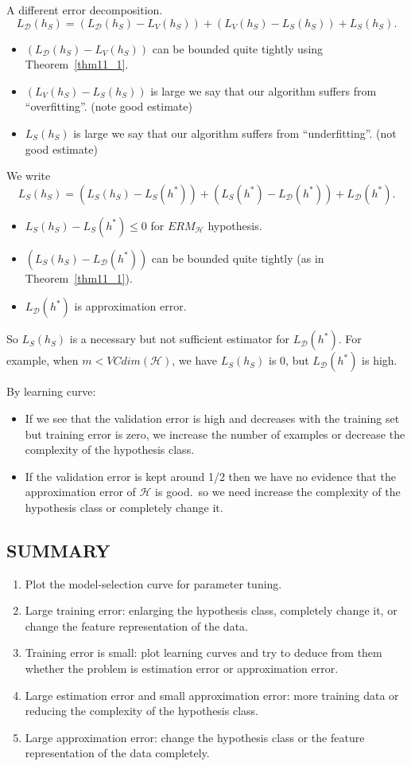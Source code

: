 A different error decomposition.
\[ L_\mathcal{D}(h_S) = (L_\mathcal{D}(h_S)-L_V(h_S)) + (L_V(h_S) - L_S(h_S)) + L_S(h_S).\]
\begin{itemize}
	\item $ (L_\mathcal{D}(h_S)-L_V(h_S)) $ can be bounded quite tightly using Theorem~\ref{thm11_1}.
	\item $ (L_V(h_S)-L_S(h_S)) $ is large we say that our algorithm suffers from ``overfitting''. (note good estimate)
	\item $ L_S(h_S) $ is large we say that our algorithm suffers from ``underfitting''. (not good estimate)
\end{itemize}

We write
\[ L_S(h_S) = (L_S(h_S)-L_S(h^*)) + (L_S(h^*)-L_\mathcal{D}(h^*)) + L_\mathcal{D}(h^*).\]
\begin{itemize}
	\item $ L_S(h_S)-L_S(h^*) \le 0 $ for $ ERM_\mathcal{H} $ hypothesis.
	\item $ (L_S(h_S) - L_\mathcal{D}(h^*)) $ can be bounded quite tightly (as in Theorem~\ref{thm11_1}).
	\item $ L_\mathcal{D}(h^*) $ is approximation error.
\end{itemize}
So $ L_S(h_S) $ is a necessary but not sufficient estimator for $ L_\mathcal{D}(h^*) $.
For example, when $ m < VCdim(\mathcal{H}) $, we have $ L_S(h_S) $ is 0, but $ L_\mathcal{D}(h^*) $ is high.

By learning curve:
\begin{itemize}
	\item If we see that the validation error is high and decreases with the training set but training error is zero, 
		we increase the number of examples or decrease the complexity of the hypothesis class.
	\item If the validation error is kept around 1/2 then we have no evidence that the approximation error of $ \mathcal{H} $ is good.\
		so we need increase the complexity of the hypothesis class or completely change it.
\end{itemize}

\subsection{SUMMARY}

\begin{enumerate}
	\item Plot the model-selection curve for parameter tuning.
	\item Large training error: enlarging the hypothesis class, completely change it, or change the feature representation of the data.
	\item Training error is small: plot learning curves and try to deduce from them whether the problem is estimation error or approximation error.
	\item Large estimation error and small approximation error: more training data or reducing the complexity of the hypothesis class.
	\item Large approximation error: change the hypothesis class or the feature representation of the data completely.
\end{enumerate}
